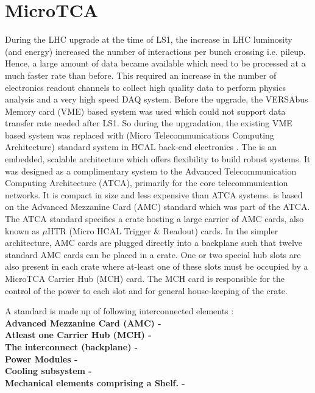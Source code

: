 \section{MicroTCA}
During the LHC upgrade at the time of LS1, the increase in LHC luminosity (and energy) increased the number of interactions per bunch crossing i.e. pileup. Hence, a large amount of data became available which need to be processed at a much faster rate than before. This required an increase in the number of electronics readout channels to collect high quality data to perform physics analysis and a very high speed DAQ system. Before the upgrade, the VERSAbus Memory card (VME) based system was used which could not support data transfer rate needed after LS1. So during the upgradation, the existing VME based system was replaced with \mtca (Micro Telecommunications Computing Architecture) standard system in HCAL back-end electronics \cite{CMS:2012tda}. The \mtca is an embedded, scalable architecture which offers flexibility to build robust systems. It was designed as a complimentary system to the Advanced Telecommunication Computing Architecture (ATCA), primarily for the core telecommunication networks. It is compact in size and less expensive than ATCA systems. \mtca is based on the Advanced Mezzanine Card (AMC) standard which was part of the ATCA. The ATCA standard specifies a crate hosting a large carrier of AMC cards, also known as $\mu$HTR (Micro HCAL Trigger \& Readout) cards. In the simpler \mtca architecture, AMC cards are plugged directly into a backplane such that twelve standard AMC cards can be placed in a crate. One or two special hub slots are also present in each crate where at-least one of these slots must be occupied by a MicroTCA Carrier Hub (MCH) card. The MCH card is responsible for the control of the power to each slot and for general house-keeping of the crate.


A \mtca standard is made up of following interconnected elements : \\ \newline
{\bf Advanced Mezzanine Card (AMC) -} \\ \newline
{\bf Atleast one \mtca Carrier Hub (MCH) -} \\ \newline
{\bf The interconnect (backplane) -} \\ \newline
{\bf Power Modules -} \\ \newline
{\bf Cooling subsystem -} \\ \newline
{\bf Mechanical elements comprising a Shelf. -} \\ \newline


